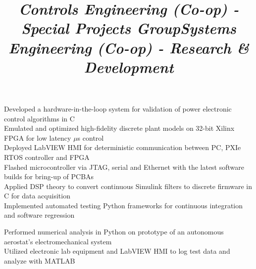 \documentclass[mm]{res}
\begin{document}
\begin{resume}
\title{\textsl{Controls Engineering (Co-op) - Special Projects Group}}
\begin{position}
\tb Developed a hardware-in-the-loop system for validation of power electronic control algorithms in C\\
\tb Emulated and optimized high-fidelity discrete plant models on 32-bit Xilinx FPGA for low latency $\mu$s control\\
\tb Deployed LabVIEW HMI for deterministic communication between PC, PXIe RTOS controller and FPGA\\
\tb Flashed microcontroller via JTAG, serial and Ethernet with the latest software builds for bring-up of PCBAs\\
\tb Applied DSP theory to convert continuous Simulink filters to discrete firmware in C for data acquisition\\
\tb Implemented automated testing Python frameworks for continuous integration and software regression
\end{position}

\title{\textsl{Systems Engineering (Co-op) - Research \& Development}}
\begin{position}
\tb Performed numerical analysis in Python on prototype of an autonomous aerostat's electromechanical system\\
\tb Utilized electronic lab equipment and LabVIEW HMI to log test data and analyze with MATLAB
\end{position}


\end{resume}
\end{document}
